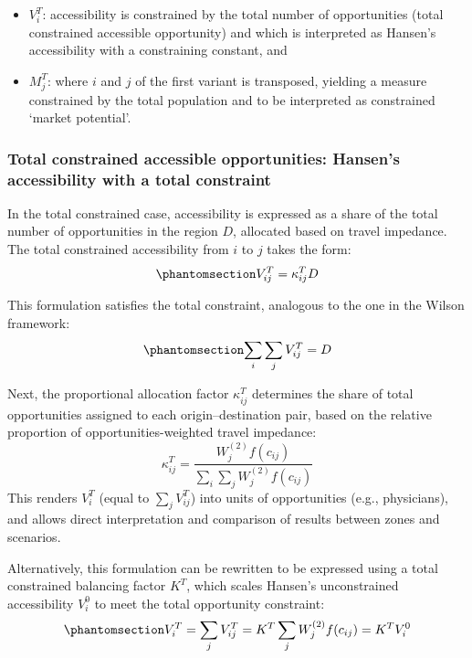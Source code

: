 \documentclass[
  10pt,
  letterpaper,
]{article}
\providecommand{\tightlist}{%
  \setlength{\itemsep}{0pt}\setlength{\parskip}{0pt}}
\begin{document}
\begin{itemize}
\tightlist
\item
  \(V_i^T\): accessibility is constrained by the total number of
  opportunities (total constrained accessible opportunity) and which is
  interpreted as Hansen's accessibility with a constraining constant,
  and
\item
  \(M_j^T\): where \(i\) and \(j\) of the first variant is transposed,
  yielding a measure constrained by the total population and to be
  interpreted as constrained `market potential'.
\end{itemize}

\subsubsection{Total constrained accessible opportunities: Hansen's
accessibility with a total
constraint}\label{total-constrained-accessible-opportunities-hansens-accessibility-with-a-total-constraint}

In the total constrained case, accessibility is expressed as a share of
the total number of opportunities in the region \(D\), allocated based
on travel impedance. The total constrained accessibility from \(i\) to
\(j\) takes the form:
\begin{equation}\phantomsection\label{eq-total-constrained-access}{
V^T_{ij} = \kappa_{ij}^T D
}\end{equation}

This formulation satisfies the total constraint, analogous to the one in
the Wilson framework:
\begin{equation}\phantomsection\label{eq-total-constraint-D}{
\sum_i \sum_j V^T_{ij} =  D
}\end{equation}

Next, the proportional allocation factor \(\kappa_{ij}^T\) determines
the share of total opportunities assigned to each origin--destination
pair, based on the relative proportion of opportunities-weighted travel
impedance: \[
\kappa_{ij}^T = \frac{W^{(2)}_j f(c_{ij})}{\sum_i\sum_j W^{(2)}_jf(c_{ij})}
\] This renders \(V_i^T\) (equal to \(\sum_jV_{ij}^T\)) into units of
opportunities (e.g., physicians), and allows direct interpretation and
comparison of results between zones and scenarios.

Alternatively, this formulation can be rewritten to be expressed using a
total constrained balancing factor \(K^T\), which scales Hansen's
unconstrained accessibility \(V_i^0\) to meet the total opportunity
constraint:
\begin{equation}\phantomsection\label{eq-total-constrained-accessibility}{
V^T_i = \sum_j V^T_{ij} = K^T \sum_j W^{(2)}_jf(c_{ij}) = K^T  V^0_i
}\end{equation}
\end{document}
